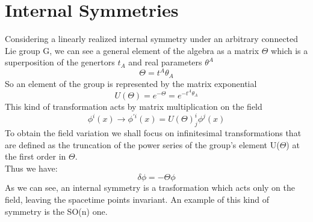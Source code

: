 \documentclass[a4paper,10pt]{article}
\begin{document}
 \section{Internal Symmetries}
 Considering a linearly realized internal symmetry under an arbitrary connected Lie group G, we can see a general element of the algebra as a matrix $\Theta$ which is a superposition of the genertors $t_A$ and real parameters $\theta^A$
 \begin{equation}
  \Theta= t^A\theta_A
 \end{equation}
  So an element of the group is represented by the matrix exponential
  \begin{equation}
   U\left(\varTheta \right) = e^{-\varTheta} = e^{-t^A\theta_A}
  \end{equation}
 This kind of transformation acts by matrix multiplication on the field
 \begin{equation}
  \phi^i(x) \rightarrow \phi^{'i}(x) = U\left(\varTheta \right)^i_j \phi^j(x)
 \end{equation}
 To obtain the field variation we shall focus on infinitesimal transformations that are defined as the truncation of the power series of the group's element U($\Theta$) at the first order in $\Theta$.\\
 Thus we have:
 \begin{equation}
  \delta\phi=-\Theta\phi
 \end{equation}
As we can see, an internal symmetry is a trasformation which acts only on the field, leaving the spacetime points invariant.
An example of this kind of symmetry is the SO(n) one.
\end{document}
